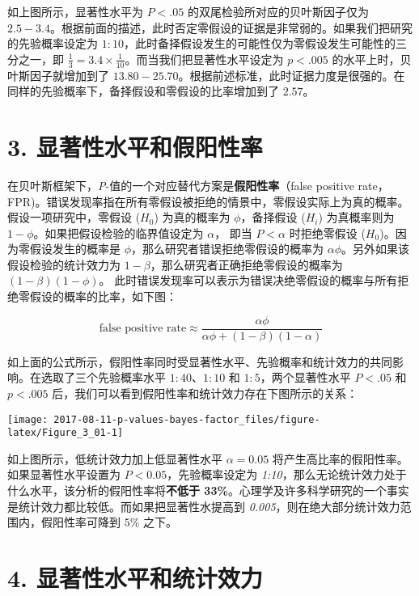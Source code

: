 \documentclass[]{article}
\begin{document}
如上图所示，显著性水平为 \(P < .05\) 的双尾检验所对应的贝叶斯因子仅为
\(2.5 - 3.4\)。根据前面的描述，此时否定零假设的证据是非常弱的。如果我们把研究的先验概率设定为
\(1:10\)，此时备择假设发生的可能性仅为零假设发生可能性的三分之一，即
\(\frac{1}{3} = 3.4 \times \frac{1}{10}\)。而当我们把显著性水平设定为
\(p < .005\) 的水平上时，贝叶斯因子就增加到了
\(13.80-25.70\)。根据前述标准，此时证据力度是很强的。在同样的先验概率下，备择假设和零假设的比率增加到了
\(2.57\)。

\hypertarget{fpr}{%
\section{3. 显著性水平和假阳性率}\label{fpr}}

在贝叶斯框架下，\emph{P}-值的一个对应替代方案是\textbf{假阳性率}（false
positive
rate，FPR)。错误发现率指在所有零假设被拒绝的情景中，零假设实际上为真的概率。假设一项研究中，零假设
(\(H_0\)) 为真的概率为 \(\phi\)，备择假设 (\(H_i\)) 为真概率则为
\(1-\phi\)。如果把假设检验的临界值设定为 \(\alpha\)， 即当
\(P < \alpha\) 时拒绝零假设 (\(H_0\))。因为零假设发生的概率是
\(\phi\)，那么研究者错误拒绝零假设的概率为
\(\alpha\phi\)。另外如果该假设检验的统计效力为
\(1-\beta\)，那么研究者正确拒绝零假设的概率为 \((1-\beta)(1-\phi)\)。
此时错误发现率可以表示为错误决绝零假设的概率与所有拒绝零假设的概率的比率，如下图：

\[
\text{false positive rate} \approx
\frac
{\alpha\phi}
{\alpha\phi + (1-\beta)(1-\alpha)}
\]

如上面的公式所示，假阳性率同时受显著性水平、先验概率和统计效力的共同影响。在选取了三个先验概率水平
\(1:40\)、\(1:10\) 和 \(1:5\)，两个显著性水平 \(P <.05\) 和 \(p <.005\)
后，我们可以看到假阳性率和统计效力存在下图所示的关系：

\begin{center}\texttt{[image: 2017-08-11-p-values-bayes-factor\_files/figure-latex/Figure\_3\_01-1]} \end{center}

如上图所示，低统计效力加上低显著性水平 \(\alpha = 0.05\)
将产生高比率的假阳性率。如果显著性水平设置为
\(P < 0.05\)，先验概率设定为
\emph{1:10}，那么无论统计效力处于什么水平，该分析的假阳性率将\textbf{不低于
33\%}。心理学及许多科学研究的一个事实是统计效力都比较低。而如果把显著性水提高到
\emph{0.005}，则在绝大部分统计效力范围内，假阳性率可降到 \(5\%\) 之下。

\hypertarget{power}{%
\section{4. 显著性水平和统计效力}\label{power}}
\end{document}
